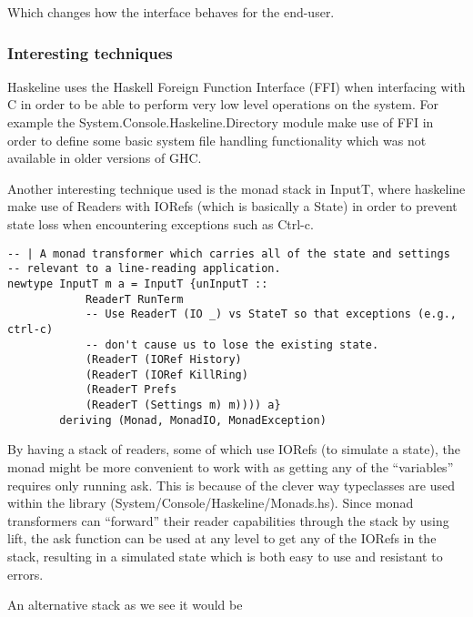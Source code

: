 \documentclass[11pt,a4paper]{article}
\begin{document}
Which changes how the interface behaves for the end-user.

\subsubsection{Interesting techniques}
Haskeline uses the Haskell Foreign Function Interface (FFI) when interfacing
with C in order to be able to perform very low level operations on the system.
For example the System.Console.Haskeline.Directory module make use of FFI in
order to define some basic system file handling functionality which was not
available in older versions of GHC.

Another interesting technique used is the monad stack in InputT, where
haskeline make use of Readers with IORefs (which is basically a State) in order
to prevent state loss when encountering exceptions such as Ctrl-c.

\begin{verbatim}
-- | A monad transformer which carries all of the state and settings
-- relevant to a line-reading application.
newtype InputT m a = InputT {unInputT ::
            ReaderT RunTerm
            -- Use ReaderT (IO _) vs StateT so that exceptions (e.g., ctrl-c)
            -- don't cause us to lose the existing state.
            (ReaderT (IORef History)
            (ReaderT (IORef KillRing)
            (ReaderT Prefs
            (ReaderT (Settings m) m)))) a}
        deriving (Monad, MonadIO, MonadException)
\end{verbatim}

By having a stack of readers, some of which use IORefs (to simulate a state),
the monad might be more convenient to work with as getting any of the
``variables'' requires only running ask. This is because of the clever way
typeclasses are used within the library (System/Console/Haskeline/Monads.hs).
Since monad transformers can ``forward'' their reader capabilities through the
stack by using lift, the ask function can be used at any level to get any of
the IORefs in the stack, resulting in a simulated state which is both easy to
use and resistant to errors.



An alternative stack as we see it would be
\end{document}
